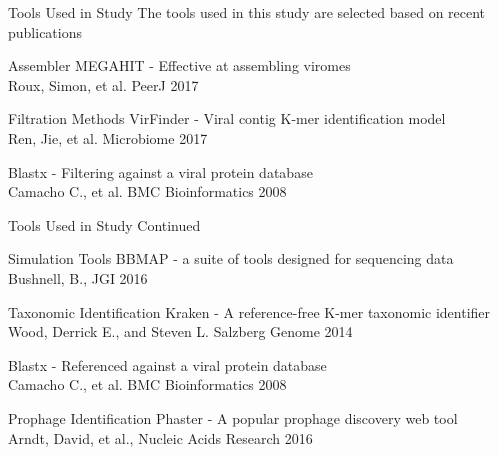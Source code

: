 \documentclass[11pt]{beamer}
\begin{document}
	\begin{frame}{Tools Used in Study}
	The tools used in this study are selected based on recent publications
	\begin{block}{Assembler}
	MEGAHIT - Effective at assembling viromes \\
	\tiny{Roux, Simon, et al. PeerJ 2017}
	\end{block}
	
	\begin{block}{Filtration Methods}
	VirFinder - Viral contig K-mer identification model \\ 
	\tiny{Ren, Jie, et al. Microbiome 2017}
	
	\large{Blastx - Filtering against a viral protein database} \\
	\tiny{Camacho C., et al. BMC Bioinformatics 2008}
	\end{block}
	
	\end{frame}
	
	\begin{frame}{Tools Used in Study Continued}
	\begin{block}{Simulation Tools}
	BBMAP - a suite of tools designed for sequencing data \\
	\tiny{Bushnell, B., JGI 2016}
	\end{block}
	
	\begin{block}{Taxonomic Identification}
	Kraken - A reference-free K-mer taxonomic identifier \\
	\tiny{Wood, Derrick E., and Steven L. Salzberg Genome 2014}
	
	\large{Blastx - Referenced against a viral protein database} \\
	\tiny{Camacho C., et al. BMC Bioinformatics 2008}
	\end{block}
	
	\begin{block}{Prophage Identification}
	Phaster - A popular prophage discovery web tool  \\
	\tiny{Arndt, David, et al., Nucleic Acids Research 2016}
	\end{block}
	\end{frame}
	
\end{document}
